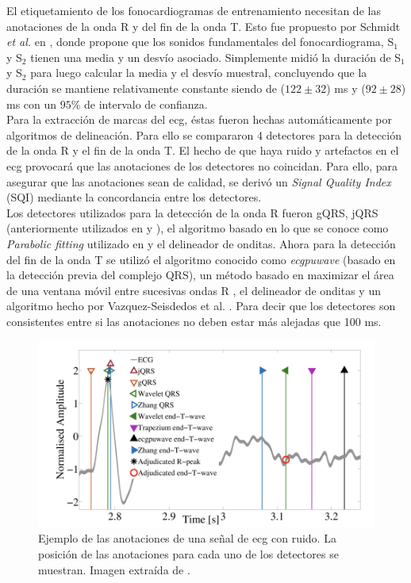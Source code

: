 \indent El etiquetamiento de los fonocardiogramas de entrenamiento necesitan de las anotaciones de la onda R y del fin de la onda T. Esto fue propuesto por Schmidt \textit{et al.} en \cite{pp:schmidt2010}, donde propone que los sonidos fundamentales del fonocardiograma, S$_1$ y S$_2$ tienen una media y un desvío asociado. Simplemente midió la duración de S$_1$ y S$_2$ para luego calcular la media y el desvío muestral, concluyendo que la duración se mantiene relativamente constante siendo de ($122 \pm 32$) ms y ($92 \pm 28$) ms con un $95\%$ de intervalo de confianza. \\
\indent Para la extracción de marcas del \acrshort{ecg}, éstas fueron hechas automáticamente por algoritmos de delineación. Para ello se compararon 4 detectores para la detección de la onda R y el fin de la onda T. El hecho de que haya ruido y artefactos en el \acrshort{ecg} provocará que las anotaciones de los detectores no coincidan. Para ello, para asegurar que las anotaciones sean de calidad, se derivó un \textit{Signal Quality Index} (SQI) mediante la concordancia entre los detectores. \\
\indent Los detectores utilizados para la detección de la onda R fueron gQRS, jQRS (anteriormente utilizados en \cite{ref:behar} y \cite{ref:behar-oster-clifford}), el algoritmo basado en lo que se conoce como \textit{Parabolic fitting} utilizado en \cite{ref:illanes-zhang} y el delineador de onditas. Ahora para la detección del fin de la onda T se utilizó el algoritmo conocido como \textit{ecgpuwave} (basado en la detección previa del complejo QRS), un método basado en maximizar el área de una ventana móvil entre sucesivas ondas R \cite{ref:zhang}, el delineador de onditas y un algoritmo hecho por Vazquez-Seisdedos et al. \cite{ref:seisdedos}. Para decir que los detectores son consistentes entre si las anotaciones no deben estar más alejadas que 100 ms.

\begin{figure}[H]
    \centering
    \includegraphics[scale=0.8]{sections/chapter-04/images/detector-agreement.png}
    \caption[Ejemplo de las anotaciones de una señal de \acrshort{ecg} con ruido. La posición de las anotaciones para cada uno de los detectores se muestran]{Ejemplo de las anotaciones de una señal de \acrshort{ecg} con ruido. La posición de las anotaciones para cada uno de los detectores se muestran. Imagen extraída de \cite{pp:springer2015}.}
    \label{fig:detector-agreement}
\end{figure}

